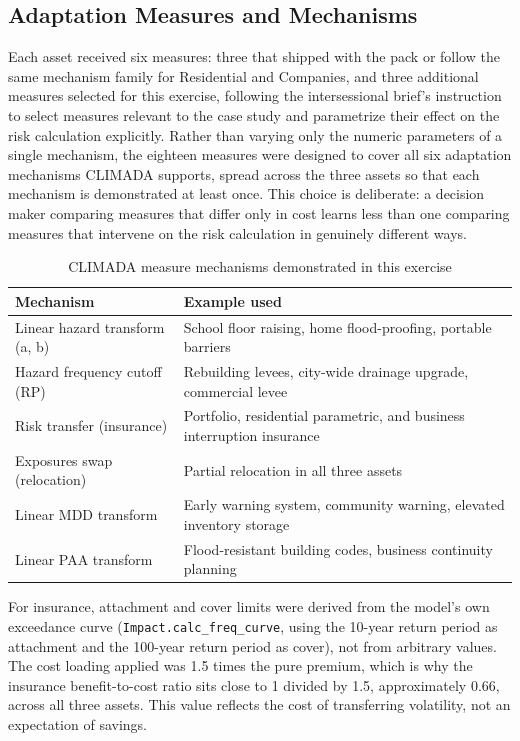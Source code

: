 \documentclass[11pt]{article}
\begin{document}
\subsection{Adaptation Measures and Mechanisms}

Each asset received six measures: three that shipped with the pack or follow the same
mechanism family for Residential and Companies, and three additional measures selected for
this exercise, following the intersessional brief's instruction to select measures relevant
to the case study and parametrize their effect on the risk calculation explicitly. Rather
than varying only the numeric parameters of a single mechanism, the eighteen measures were
designed to cover all six adaptation mechanisms CLIMADA supports, spread across the three
assets so that each mechanism is demonstrated at least once. This choice is deliberate: a
decision maker comparing measures that differ only in cost learns less than one comparing
measures that intervene on the risk calculation in genuinely different ways.

\begin{table}[H]
\centering
\caption{CLIMADA measure mechanisms demonstrated in this exercise}
\label{tab:mechanisms}
\begin{tabular}{p{5cm}p{8cm}}
\toprule
Mechanism & Example used \\
\midrule
Linear hazard transform (a, b) & School floor raising, home flood-proofing, portable barriers \\
Hazard frequency cutoff (RP) & Rebuilding levees, city-wide drainage upgrade, commercial levee \\
Risk transfer (insurance) & Portfolio, residential parametric, and business interruption insurance \\
Exposures swap (relocation) & Partial relocation in all three assets \\
Linear MDD transform & Early warning system, community warning, elevated inventory storage \\
Linear PAA transform & Flood-resistant building codes, business continuity planning \\
\bottomrule
\end{tabular}
\end{table}

For insurance, attachment and cover limits were derived from the model's own exceedance
curve (\texttt{Impact.calc\_freq\_curve}, using the 10-year return period as attachment and
the 100-year return period as cover), not from arbitrary values. The cost loading applied
was 1.5 times the pure premium, which is why the insurance benefit-to-cost ratio sits close
to 1 divided by 1.5, approximately 0.66, across all three assets. This value reflects the
cost of transferring volatility, not an expectation of savings.
\end{document}
